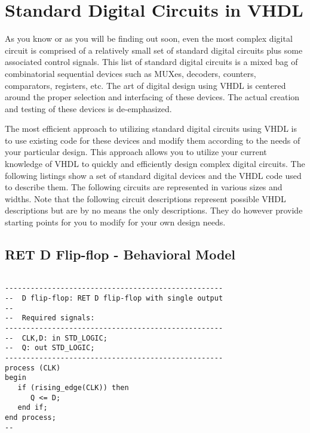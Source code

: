 %
%
%
\chapter{Standard Digital Circuits in VHDL}
As you know or as you will be finding out soon, even the most complex digital circuit is comprised of a relatively small set of standard digital circuits plus some associated control signals. This list of standard digital circuits is a mixed bag of combinatorial sequential devices such as MUXes, decoders, counters, comparators, registers, etc. The art of digital design using VHDL is centered around the proper selection and interfacing of these devices. The actual creation and testing of these devices is de-emphasized. 

The most efficient approach to utilizing standard digital circuits using VHDL is to use existing code for these devices and modify them according to the needs of your particular design. This approach allows you to utilize your current knowledge of VHDL to quickly and efficiently design complex digital circuits. The following listings show a set of standard digital devices and the VHDL code used to describe them. The following circuits are represented in various sizes and widths. Note that the following circuit descriptions represent possible VHDL descriptions but are by no means the only descriptions. They do however provide starting points for you to modify for your own design needs. 

\section{RET D Flip-flop - Behavioral Model}

\noindent
\begin{minipage}{0.99\linewidth}
\begin{lstlisting}

---------------------------------------------------
--  D flip-flop: RET D flip-flop with single output
--
--  Required signals: 
---------------------------------------------------
--  CLK,D: in STD_LOGIC;
--  Q: out STD_LOGIC;
---------------------------------------------------
process (CLK) 
begin
   if (rising_edge(CLK)) then  
      Q <= D;
   end if;
end process;
--
\end{lstlisting}
\end{minipage}

